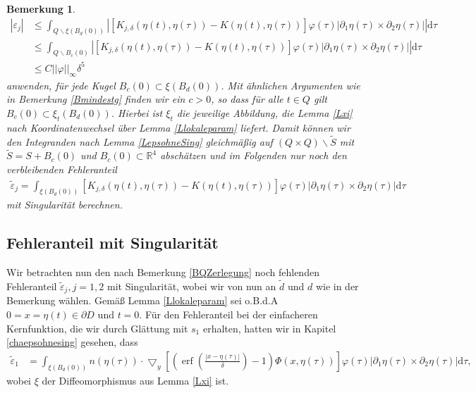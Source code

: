 \documentclass[12pt,a4paper]{scrartcl}
\newtheorem{Bemerkung}[Satz]{Bemerkung}
\newcommand{\dd}{\mathrm{d}}
\numberwithin{equation}{section}
\newcommand{\R}{\mathbb{R}} %
\newcommand{\grad}{\bigtriangledown}
\newcommand{\erf}{\operatorname{erf}}
\begin{document}
\begin{Bemerkung}
\begin{align*}
|\varepsilon_j|& \leq \int_{Q \backslash \xi(B_d(0))}\left| \left[K_{j,\delta}(\eta(t),\eta(\tau))- K(\eta(t),\eta(\tau))\right]\varphi(\tau) |\partial_1 \eta (\tau) \times \partial_2 \eta(\tau)| \right| \dd \tau \\
& \leq \int_{Q \backslash B_{c}(0)} \left| \left[K_{j,\delta}(\eta(t),\eta(\tau))- K(\eta(t),\eta(\tau))\right]\varphi(\tau) |\partial_1 \eta (\tau) \times \partial_2 \eta(\tau)| \right| \dd \tau \\
& \leq C ||\varphi||_\infty \delta^5
\end{align*}
 anwenden, für jede Kugel $B_{c}(0)\subset\xi(B_d(0))$. Mit ähnlichen Argumenten wie in Bemerkung \ref{Bmindestg} finden wir ein $c>0$, so dass für alle $t\in Q$ gilt $B_c(0) \subset \xi_t(B_d(0))$. Hierbei ist $\xi_t$ die jeweilige Abbildung, die Lemma \ref{Lxi} nach Koordinatenwechsel über Lemma \ref{Llokaleparam} liefert.  Damit können wir den Integranden nach Lemma \ref{LepsohneSing} gleichmäßig auf $(Q \times Q) \backslash \tilde S$ mit $\tilde S= S+ B_c(0)$ und $B_c(0)\subset \R^4$ abschätzen und im Folgenden nur noch den verbleibenden Fehleranteil 
 \begin{align*}
 \widetilde \varepsilon_j = \int_{\xi(B_d(0))} \left[K_{j,\delta}(\eta(t),\eta(\tau))- K(\eta(t),\eta(\tau))\right]\varphi(\tau) |\partial_1 \eta (\tau) \times \partial_2 \eta(\tau)| \dd \tau
 \end{align*}
 mit Singularität berechnen.
\end{Bemerkung}


\subsection{Fehleranteil mit Singularität}
Wir betrachten nun den nach Bemerkung \ref{BQZerlegung} noch fehlenden Fehleranteil $\widetilde \varepsilon_j, j=1,2$ mit Singularität, wobei wir von nun an $\widetilde d$ und $d$ wie in der Bemerkung wählen. Gemäß Lemma \ref{Llokaleparam} sei o.B.d.A $0=x= \eta(t) \in \partial D$ und $t=0$. Für den Fehleranteil bei der einfacheren Kernfunktion, die wir durch Glättung mit $s_1$ erhalten, hatten wir in Kapitel \ref{chaepsohnesing} gesehen, dass
\begin{align*}
\widetilde \varepsilon_1 &= \int_{\xi(B_d(0))} n(\eta(\tau)) \cdot \grad_y \left[ \left(\erf \left(\frac{|x-\eta(\tau)|}{\delta}\right) - 1\right) \Phi (x,\eta(\tau)) \right]\varphi(\tau) |\partial_1 \eta (\tau) \times \partial_2 \eta(\tau)| \dd \tau,
\end{align*}
wobei $\xi$ der Diffeomorphismus aus Lemma \ref{Lxi} ist.
\end{document}
